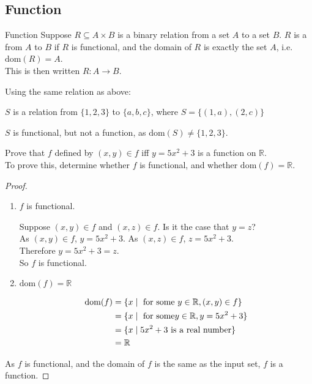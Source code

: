 \documentclass[../notes.tex]{subfiles}
\begin{document}
			\subsection{Function}
				\begin{definition}{Function}
					Suppose $R \subseteq A \times B$ is a binary relation from a set $A$ to a set $B$. $R$ is a  from $A$ to $B$ if $R$ is functional, and the domain of $R$ is exactly the set $A$, i.e. $\mathrm{dom}(R) = A$.\\
					This is then written $R: A \rightarrow B$.
				\end{definition}
				\begin{example}
					Using the same relation as above:
						\begin{indentparagraph}
							$S$ is a relation from $\{1, 2, 3\}$ to $\{a, b, c\}$, where $S = \bigl\{(1, a), (2, c)\bigr\}$
						\end{indentparagraph}
						$S$ is functional, but not a function, as $\mathrm{dom}(S) \neq \{1, 2, 3\}$.
				\end{example}
				\begin{example}
					Prove that $f$ defined by $(x, y) \in f$ iff $y = 5x^{2} + 3$ is a function on $\mathbb{R}$.\\
					To prove this, determine whether $f$ is functional, and whether $\mathrm{dom}(f) = \mathbb{R}$.
					\begin{proof}
						$ $
						\begin{enumerate}[label=(\roman*)]
							\item $f$ is functional.
								\begin{subproof}
									Suppose $(x, y) \in f$ and $(x, z) \in f$. Is it the case that $y = z$?\\
									As $(x, y) \in f$, $y = 5x^{2} + 3$. As $(x, z) \in f$, $z = 5x^{2} + 3$.\\
									Therefore $y = 5x^{2} + 3 = z$.\\
									So $f$ is functional. 
								\end{subproof}
							\item $\mathrm{dom}(f) = \mathbb{R}$
								\begin{subproof} \moveup
									\begin{align*}
										\mathrm{dom}(f) &= \{x \mid \text{ for some } y \in \mathbb{R}, (x, y) \in f\}\\
										&= \{x \mid \text{ for some} y \in \mathbb{R}, y = 5x^{2} + 3\}\\
										&= \{x \mid 5x^{2} + 3 \text{ is a real number}\}\\
										&= \mathbb{R} \qedhere
									\end{align*}
								\end{subproof}
						\end{enumerate}
						As $f$ is functional, and the domain of $f$ is the same as the input set, $f$ is a function.
					\end{proof}
				\end{example}
\end{document}
